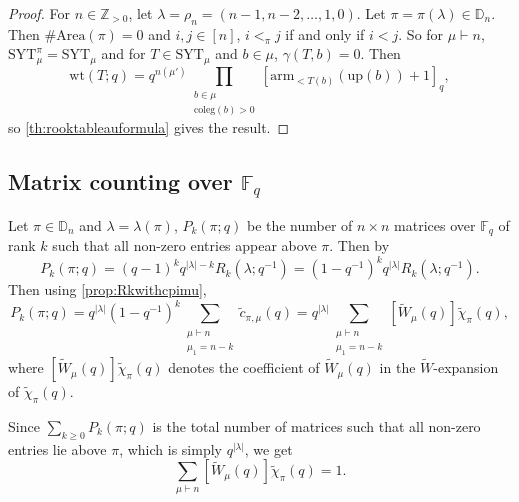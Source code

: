\documentclass[12pt,reqno]{amsart}
\theoremstyle{plain}
\theoremstyle{definition}
\theoremstyle{remark}
\theoremstyle{example}
\numberwithin{equation}{section}
\newcommand\ZZ{\mathbb{Z}}
\newcommand\up{\mathrm{up}}
\newcommand\arm{\mathrm{arm}}
\newcommand{\coleg}{\mathrm{coleg}}
\newcommand{\SYT}{\mathrm{SYT}}
\newcommand{\wt}{\mathrm{wt}}
\newcommand{\Area}{\mathrm{Area}}
\newcommand{\DD}{\mathbb{D}}
\begin{document}
\begin{proof}
	For $n \in \ZZ_{>0}$, let $\lambda = \rho_n = (n-1,n-2,\ldots,1,0)$. Let $\pi = \pi(\lambda) \in \DD_n$. Then $\# \Area(\pi) = 0$ and $i,j \in [n]$, $i <_\pi j$ if and only if $i<j$. So for $\mu \vdash n$, $\SYT^\pi_\mu = \SYT_\mu$ and for $T \in \SYT_\mu$ and $b \in \mu$, $\gamma(T,b) = 0$. Then $$ \wt(T;q) =   q^{n(\mu')} 
	\prod_{\substack{b \in \mu \\ \coleg(b)>0}} [\arm_{< T(b)}(\up(b))+1]_q,$$ so \autoref{th:rooktableauformula} gives the result.
	
\end{proof}


\subsection{Matrix counting over $\mathbb{F}_q$}

Let $\pi \in \DD_n$ and $\lambda = \lambda(\pi)$, $P_k(\pi;q)$ be the number of $n \times n$ matrices over $\mathbb{F}_q$ of rank $k$ such that all non-zero entries appear above $\pi$. Then by \cite[Theorem 1]{Haglund_qrookfinitefield} $$ P_k(\pi;q) = (q-1)^k q^{|\lambda|-k} R_k(\lambda;q^{-1}) = (1-q^{-1})^k q^{|\lambda|} R_k(\lambda;q^{-1}). $$ Then using \autoref{prop:Rkwithcpimu}, \begin{equation}\label{eq:numHessmat}
	P_k(\pi;q) = q^{|\lambda|}(1-q^{-1})^k \sum_{\substack{\mu \vdash n \\ \mu_1 = n-k}} \widetilde{c}_{\pi,\mu}(q) = q^{|\lambda|}\sum\limits_{\substack{\mu \vdash n \\ \mu_1 = n-k}} [\widetilde{W}_\mu(q)] \widetilde{\chi}_\pi(q),
\end{equation} where $[\widetilde{W}_\mu(q)] \widetilde{\chi}_\pi(q)$ denotes the coefficient of $\widetilde{W}_\mu(q)$ in the $\widetilde{W}$-expansion of $\widetilde{\chi}_\pi(q)$. 

Since $\sum_{k \geq 0} P_k(\pi;q)$ is the total number of matrices such that all non-zero entries lie above $\pi$, which is simply $q^{|\lambda|}$, we get $$ \sum_{\mu \vdash n} [\widetilde{W}_\mu(q)] \widetilde{\chi}_\pi(q) = 1.$$
\end{document}
